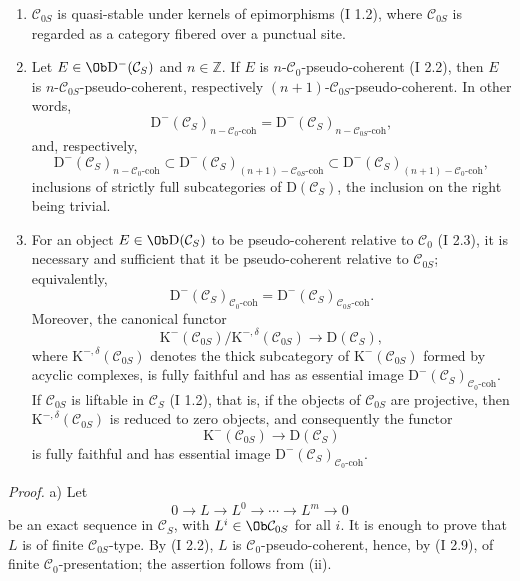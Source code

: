 \documentclass[11pt]{article}
\begin{document}
\begin{enumerate}[label=\alph*)]
\item $\mathcal C_{0S}$ is quasi-stable under kernels of epimorphisms (I 1.2), where $\mathcal C_{0S}$ is regarded as a category fibered over a punctual site.
\item Let $E\in\Ob \mathrm D^{-}(\mathcal C_S)$ and $n\in\mathbb Z$. If $E$ is $n$-$\mathcal C_0$-pseudo-coherent (I 2.2), then $E$ is $n$-$\mathcal C_{0S}$-pseudo-coherent, respectively $(n+1)$-$\mathcal C_{0S}$-pseudo-coherent. In other words,
\[
\mathrm D^{-}(\mathcal C_S)_{n-\mathcal C_0\text{-coh}}
=
\mathrm D^{-}(\mathcal C_S)_{n-\mathcal C_{0S}\text{-coh}},
\]
and, respectively,
\[
\mathrm D^{-}(\mathcal C_S)_{n-\mathcal C_0\text{-coh}}
\subset
\mathrm D^{-}(\mathcal C_S)_{(n+1)-\mathcal C_{0S}\text{-coh}}
\subset
\mathrm D^{-}(\mathcal C_S)_{(n+1)-\mathcal C_0\text{-coh}},
\]
inclusions of strictly full subcategories of $\mathrm D(\mathcal C_S)$, the inclusion on the right being trivial.
\item For an object $E\in\Ob\mathrm D(\mathcal C_S)$ to be pseudo-coherent relative to $\mathcal C_0$ (I 2.3), it is necessary and sufficient that it be pseudo-coherent relative to $\mathcal C_{0S}$; equivalently,
\[
\mathrm D^{-}(\mathcal C_S)_{\mathcal C_0\text{-coh}}
=
\mathrm D^{-}(\mathcal C_S)_{\mathcal C_{0S}\text{-coh}}.
\]
Moreover, the canonical functor
\[
\mathrm K^{-}(\mathcal C_{0S})/\mathrm K^{-,\delta}(\mathcal C_{0S})
\longrightarrow \mathrm D(\mathcal C_S),
\]
where $\mathrm K^{-,\delta}(\mathcal C_{0S})$ denotes the thick subcategory of $\mathrm K^{-}(\mathcal C_{0S})$ formed by acyclic complexes, is fully faithful and has as essential image $\mathrm D^{-}(\mathcal C_S)_{\mathcal C_0\text{-coh}}$. If $\mathcal C_{0S}$ is liftable in $\mathcal C_S$ (I 1.2), that is, if the objects of $\mathcal C_{0S}$ are projective, then $\mathrm K^{-,\delta}(\mathcal C_{0S})$ is reduced to zero objects, and consequently the functor
\[
\mathrm K^{-}(\mathcal C_{0S})\longrightarrow \mathrm D(\mathcal C_S)
\]
is fully faithful and has essential image $\mathrm D^{-}(\mathcal C_S)_{\mathcal C_0\text{-coh}}$.
\end{enumerate}

\emph{Proof.} a) Let
\[
0\longrightarrow L\longrightarrow L^0\longrightarrow\cdots\longrightarrow L^m\longrightarrow0
\]
be an exact sequence in $\mathcal C_S$, with $L^i\in\Ob\mathcal C_{0S}$ for all $i$. It is enough to prove that $L$ is of finite $\mathcal C_{0S}$-type. By (I 2.2), $L$ is $\mathcal C_0$-pseudo-coherent, hence, by (I 2.9), of finite $\mathcal C_0$-presentation; the assertion follows from (ii).
\end{document}
